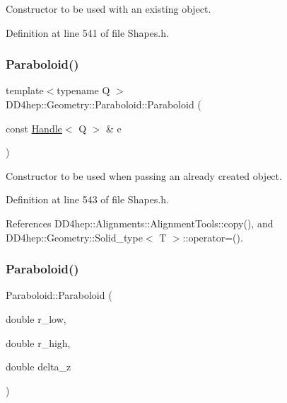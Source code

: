 Constructor to be used with an existing object. 



Definition at line 541 of file Shapes.\+h.

\hypertarget{class_d_d4hep_1_1_geometry_1_1_paraboloid_abcee00ef3c24c33cf39c943475e636cf}{}\label{class_d_d4hep_1_1_geometry_1_1_paraboloid_abcee00ef3c24c33cf39c943475e636cf} 
\subsubsection{\texorpdfstring{Paraboloid()}{Paraboloid()}\hspace{0.1cm}{\footnotesize\ttfamily [4/5]}}
{\footnotesize\ttfamily template$<$typename Q $>$ \\
D\+D4hep\+::\+Geometry\+::\+Paraboloid\+::\+Paraboloid (\begin{DoxyParamCaption}\item[{const \hyperlink{class_d_d4hep_1_1_handle}{Handle}$<$ Q $>$ \&}]{e }\end{DoxyParamCaption})\hspace{0.3cm}{\ttfamily [inline]}}



Constructor to be used when passing an already created object. 



Definition at line 543 of file Shapes.\+h.



References D\+D4hep\+::\+Alignments\+::\+Alignment\+Tools\+::copy(), and D\+D4hep\+::\+Geometry\+::\+Solid\+\_\+type$<$ T $>$\+::operator=().

\hypertarget{class_d_d4hep_1_1_geometry_1_1_paraboloid_a5819ff6e96e1969a6e342d53e4bdc09c}{}\label{class_d_d4hep_1_1_geometry_1_1_paraboloid_a5819ff6e96e1969a6e342d53e4bdc09c} 
\subsubsection{\texorpdfstring{Paraboloid()}{Paraboloid()}\hspace{0.1cm}{\footnotesize\ttfamily [5/5]}}
{\footnotesize\ttfamily Paraboloid\+::\+Paraboloid (\begin{DoxyParamCaption}\item[{double}]{r\+\_\+low,  }\item[{double}]{r\+\_\+high,  }\item[{double}]{delta\+\_\+z }\end{DoxyParamCaption})}



